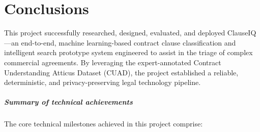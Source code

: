 \chapter{Conclusions}
\label{ch:conclusions}

This project successfully researched, designed, evaluated, and deployed ClauseIQ---an end-to-end, machine learning-based contract clause classification and intelligent search prototype system engineered to assist in the triage of complex commercial agreements. By leveraging the expert-annotated Contract Understanding Atticus Dataset (CUAD), the project established a reliable, deterministic, and privacy-preserving legal technology pipeline.

\paragraph*{Summary of technical achievements}
The core technical milestones achieved in this project comprise:
